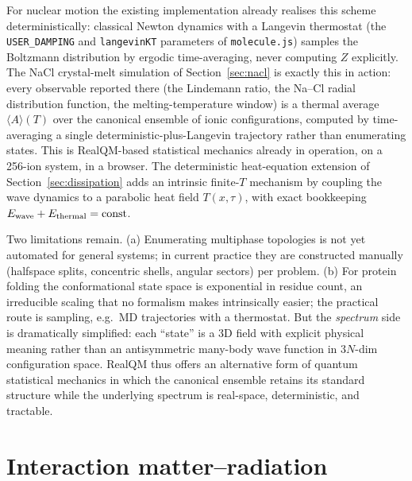 \documentclass[11pt]{article}
\begin{document}
For nuclear motion the existing implementation already realises this scheme deterministically: classical Newton dynamics with a Langevin thermostat (the \texttt{USER\_DAMPING} and \texttt{langevinKT} parameters of \texttt{molecule.js}) samples the Boltzmann distribution by ergodic time-averaging, never computing $Z$ explicitly. The NaCl crystal-melt simulation of Section~\ref{sec:nacl} is exactly this in action: every observable reported there (the Lindemann ratio, the Na--Cl radial distribution function, the melting-temperature window) is a thermal average $\langle A \rangle(T)$ over the canonical ensemble of ionic configurations, computed by time-averaging a single deterministic-plus-Langevin trajectory rather than enumerating states. This is RealQM-based statistical mechanics already in operation, on a 256-ion system, in a browser. The deterministic heat-equation extension of Section~\ref{sec:dissipation} adds an intrinsic finite-$T$ mechanism by coupling the wave dynamics to a parabolic heat field $T(x, \tau)$, with exact bookkeeping $E_{\rm wave} + E_{\rm thermal} = \mathrm{const}$.

Two limitations remain. (a) Enumerating multiphase topologies is not yet automated for general systems; in current practice they are constructed manually (halfspace splits, concentric shells, angular sectors) per problem. (b) For protein folding the conformational state space is exponential in residue count, an irreducible scaling that no formalism makes intrinsically easier; the practical route is sampling, e.g.\ MD trajectories with a thermostat. But the \emph{spectrum} side is dramatically simplified: each ``state'' is a 3D field with explicit physical meaning rather than an antisymmetric many-body wave function in $3N$-dim configuration space. RealQM thus offers an alternative form of quantum statistical mechanics in which the canonical ensemble retains its standard structure while the underlying spectrum is real-space, deterministic, and tractable.

\section{Interaction matter--radiation}\label{sec:matter-radiation}
\end{document}

